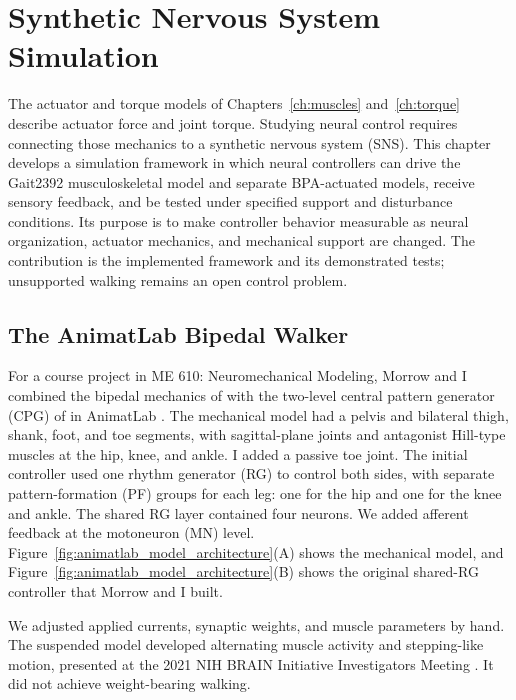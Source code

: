 \chapter{Synthetic Nervous System Simulation}\label{ch:sns}
\graphicspath{{figs/60-sns/}{figs/60-sns/AnimatLab_reference/}}

The actuator and torque models of Chapters~\ref{ch:muscles} and~\ref{ch:torque} describe actuator force and joint torque. Studying neural control requires connecting those mechanics to a synthetic nervous system (SNS). This chapter develops a simulation framework in which neural controllers can drive the Gait2392 musculoskeletal model and separate BPA-actuated models, receive sensory feedback, and be tested under specified support and disturbance conditions. Its purpose is to make controller behavior measurable as neural organization, actuator mechanics, and mechanical support are changed. The contribution is the implemented framework and its demonstrated tests; unsupported walking remains an open control problem.

\section{The AnimatLab Bipedal Walker}\label{sec:prior_walker}

For a course project in ME 610: Neuromechanical Modeling, Morrow and I combined the bipedal mechanics of \citet{li_bipedal_2017} with the two-level central pattern generator (CPG) of \citet{deng_neuromechanical_2019} in AnimatLab \citep{cofer_animatlab_2010}. The mechanical model had a pelvis and bilateral thigh, shank, foot, and toe segments, with sagittal-plane joints and antagonist Hill-type muscles at the hip, knee, and ankle. I added a passive toe joint. The initial controller used one rhythm generator (RG) to control both sides, with separate pattern-formation (PF) groups for each leg: one for the hip and one for the knee and ankle. The shared RG layer contained four neurons. We added afferent feedback at the motoneuron (MN) level. Figure~\ref{fig:animatlab_model_architecture}(A) shows the mechanical model, and Figure~\ref{fig:animatlab_model_architecture}(B) shows the original shared-RG controller that Morrow and I built.

We adjusted applied currents, synaptic weights, and muscle parameters by hand. The suspended model developed alternating muscle activity and stepping-like motion, presented at the 2021 NIH BRAIN Initiative Investigators Meeting \citep{bolenTorqueValuesArtificialKnee2021June15-17}. It did not achieve weight-bearing walking.

